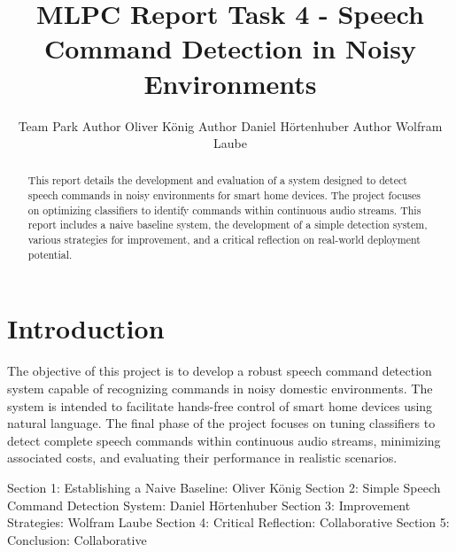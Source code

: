 \documentclass{article}
\title{MLPC Report Task 4 - Speech Command Detection in Noisy Environments}
\author{%
  Team Park \And
  Author Oliver König \And
  Author Daniel Hörtenhuber \And
  Author Wolfram Laube
}
\begin{document}
\maketitle

\begin{abstract}
This report details the development and evaluation of a system designed to detect speech commands in noisy environments for smart home devices. The project focuses on optimizing classifiers to identify commands within continuous audio streams. This report includes a naive baseline system, the development of a simple detection system, various strategies for improvement, and a critical reflection on real-world deployment potential.
\end{abstract}

\section{Introduction}
The objective of this project is to develop a robust speech command detection system capable of recognizing commands in noisy domestic environments. The system is intended to facilitate hands-free control of smart home devices using natural language. The final phase of the project focuses on tuning classifiers to detect complete speech commands within continuous audio streams, minimizing associated costs, and evaluating their performance in realistic scenarios.

\begin{contributions}
  Section 1: Establishing a Naive Baseline: Oliver König \AND
  Section 2: Simple Speech Command Detection System: Daniel Hörtenhuber \AND
  Section 3: Improvement Strategies: Wolfram Laube \AND
  Section 4: Critical Reflection: Collaborative \AND
  Section 5: Conclusion: Collaborative
\end{contributions}






\end{document}
